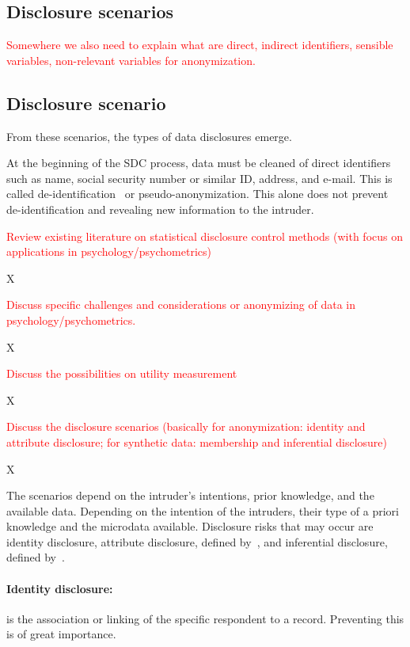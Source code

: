 \documentclass{article}
\begin{document}
\subsection{Disclosure scenarios}

\textcolor{red}{Somewhere we also need to explain what are direct, indirect identifiers, sensible variables, non-relevant variables for anonymization.}


\subsection{Disclosure scenario}

From these scenarios, the types of data disclosures emerge.

At the beginning of the SDC process, data must be cleaned of direct identifiers such as name, social security number or similar ID, address, and e-mail. This is called de-identification~\cite{2001_Duncan} or pseudo-anonymization. This alone does not prevent de-identification and revealing new information to the intruder.

\textcolor{red}{Review existing literature on statistical disclosure control methods (with focus on applications in psychology/psychometrics)}

X

\textcolor{red}{Discuss specific challenges and considerations or anonymizing of data in psychology/psychometrics.}

X

\textcolor{red}{Discuss the possibilities on utility measurement}

X

\textcolor{red}{Discuss the disclosure scenarios (basically for anonymization: identity and attribute disclosure; for synthetic data: membership and inferential disclosure)}

X

The scenarios depend on the intruder's intentions, prior knowledge, and the available data.
Depending on the intention of the intruders, their type of a priori knowledge and the microdata available.
Disclosure risks that may occur are identity disclosure, attribute disclosure, defined by~\cite{1989_Duncan}, and inferential disclosure, defined by~\cite{1977_Dalenius}.

\paragraph{Identity disclosure:} is the association or linking of the specific respondent to a record. Preventing this is of great importance. 
\end{document}
